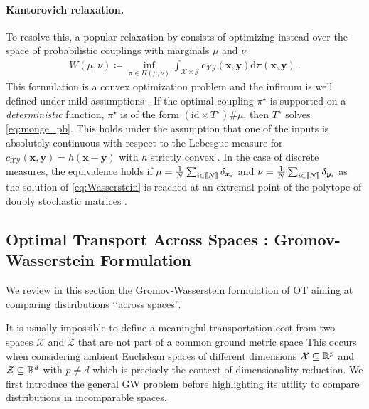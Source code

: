 \paragraph{Kantorovich relaxation.} To resolve this, a popular relaxation by \citep{kantorovich1942translocation} consists of optimizing instead over the space of probabilistic couplings with marginals $\mu$ and $\nu$
\begin{align}\label{eq:Wasserstein}
	W(\mu, \nu) \coloneqq \inf_{\pi \in \Pi(\mu, \nu)} \int_{\mathcal{X} \times \mathcal{Y}} c_{\mathcal{X} \mathcal{Y}}(\bm{x}, \bm{y}) \mathrm{d}\pi(\bm{x}, \bm{y}) \:.
\end{align}
This formulation is a convex optimization problem and the infimum is well
defined under mild assumptions \citep{santambrogio2015optimal}. If the optimal
coupling $\pi^\star$ is supported on a \emph{deterministic} function, \ie
$\pi^\star$ is of the form $(\mathrm{id} \times T^\star)\# \mu$, then
$T^\star$ solves \eqref{eq:monge_pb}. This holds under the assumption that one
of the inputs is absolutely continuous with respect to the Lebesgue measure
for $c_{\mathcal{X} \mathcal{Y}}(\bm{x}, \bm{y}) = h(\bm{x} - \bm{y})$ with
$h$ strictly convex \citep{gangbo1996geometry}. In the case of discrete
measures, the equivalence holds if $\mu = \frac{1}{N} \sum_{i \in {[\![N]\!]}}
\delta_{\bm{x}_i}$ and $\nu = \frac{1}{N} \sum_{i \in {[\![N]\!]}}
\delta_{\bm{y}_i}$ as the solution of \eqref{eq:Wasserstein} is reached at an
extremal point of the polytope of doubly stochastic matrices
\citep{bertsimas1997introduction}.

\subsection{Optimal Transport Across Spaces : Gromov-Wasserstein Formulation}

We review in this section the Gromov-Wasserstein formulation of OT aiming at comparing distributions ‘‘across spaces''.

It is usually impossible to define a meaningful transportation cost from two spaces $\mathcal{X}$ and $\mathcal{Z}$ that are not part of a common ground metric space
This occurs when considering ambient Euclidean spaces of different dimensions \ie $\mathcal{X} \subseteq \mathbb{R}^p$ and $\mathcal{Z} \subseteq \mathbb{R}^d$ with $p \neq d$ which is precisely the context of dimensionality reduction.
We first introduce the general GW problem before highlighting its utility to compare distributions in incomparable spaces.

